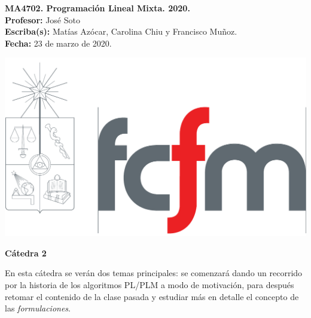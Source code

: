 \documentclass[10pt]{article}
\theoremstyle{plain}
\theoremstyle{definition}
\begin{document}
\vspace*{-1.2 cm}
\begin{minipage}{0.6\textwidth}
\begin{flushleft}
\hspace*{-0.5cm}\textbf{MA4702. Programación Lineal Mixta. 2020.}\\
\hspace*{-0.5cm}\textbf{Profesor:} José Soto\\
\hspace*{-0.5cm}\textbf{Escriba(s):} Matías Azócar, Carolina Chiu y Francisco Muñoz.\\
\hspace*{-0.5cm}\textbf{Fecha:} 23 de marzo de 2020.
\end{flushleft}
\end{minipage}
\begin{minipage}{0.36\textwidth}
\begin{flushright}
\includegraphics[scale=0.15]{fcfm}
\end{flushright}
\end{minipage}
\bigskip

\begin{center}
\LARGE\textbf{Cátedra 2 }
\end{center}

En esta cátedra se verán dos temas principales: se comenzará dando un recorrido por la historia de los algoritmos PL/PLM a modo de motivación, para después retomar el contenido de la clase pasada y estudiar más en detalle el concepto de las \textit{formulaciones}.
\end{document}
